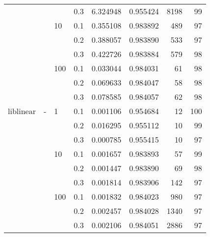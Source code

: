 \begin{table}[H]
\begin{tabular}{llllrrrr}
          &   &     & 0.3 &  6.324948 &  0.955424 &    8198 &    99 \\
          &   & 10  & 0.1 &  0.355108 &  0.983892 &     489 &    97 \\
          &   &     & 0.2 &  0.388057 &  0.983890 &     533 &    97 \\
          &   &     & 0.3 &  0.422726 &  0.983884 &     579 &    98 \\
          &   & 100 & 0.1 &  0.033044 &  0.984031 &      61 &    98 \\
          &   &     & 0.2 &  0.069633 &  0.984047 &      58 &    98 \\
          &   &     & 0.3 &  0.078585 &  0.984057 &      62 &    98 \\
liblinear & - & 1   & 0.1 &  0.001106 &  0.954684 &      12 &   100 \\
          &   &     & 0.2 &  0.016295 &  0.955112 &      10 &    99 \\
          &   &     & 0.3 &  0.000785 &  0.955415 &      10 &    97 \\
          &   & 10  & 0.1 &  0.001657 &  0.983893 &      57 &    99 \\
          &   &     & 0.2 &  0.001447 &  0.983890 &      69 &    98 \\
          &   &     & 0.3 &  0.001814 &  0.983906 &     142 &    97 \\
          &   & 100 & 0.1 &  0.001832 &  0.984023 &     980 &    97 \\
          &   &     & 0.2 &  0.002457 &  0.984028 &    1340 &    97 \\
          &   &     & 0.3 &  0.002106 &  0.984051 &    2886 &    97 \\
\bottomrule
\end{tabular}
\end{table}
